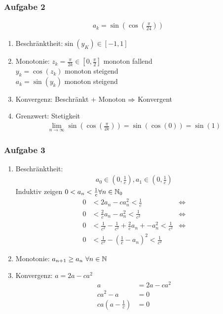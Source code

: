 \subsubsection{Aufgabe 2}
\begin{align*}
    a_k = \sin(\cos(\frac{\pi}{24}))
\end{align*}
\begin{enumerate}[label=\roman*)]
    \item Beschränktheit:$\sin(y_K) \in [-1, 1]$
    \item Monotonie: $z_k = \frac{\pi}{2k} \in [0, \frac{\pi}{2}]$ monoton fallend\\
    $y_k = \cos(z_k)$ monoton steigend\\
    $a_k = \sin(y_k)$ monoton steigend
    \item Konvergenz: Beschränkt + Monoton $\Rightarrow$ Konvergent
    \item Grenzwert: Stetigkeit
    \begin{align*}
        \lim_{n \rightarrow \infty} \sin(\cos(\frac{\pi}{2k})) = \sin(\cos(0)) = \sin(1)
    \end{align*}
\end{enumerate}
\subsubsection{Aufgabe 3}
\begin{enumerate}[label=\roman*)]
    \item Beschränktheit: 
    \begin{align*}
        a_0 \in (0, \frac{1}{c}), a_1 \in (0, \frac{1}{c})
    \end{align*}
    Induktiv zeigen $0 < a_{n} < \frac{1}{c} \forall n \in \mathbb N_0$
    \begin{align*}
        0 &< 2a_n - ca_n^2 < \frac{1}{c} &\Leftrightarrow\\
        0 &< \frac{2}{c} a_n - a_n^2 < \frac{1}{c^2} &\Leftrightarrow\\
        0 &< \frac{1}{c^2} - \frac{1}{c^2} + \frac{2}{c}a_n + - a_n ^2 < \frac{1}{c^2} &\Leftrightarrow\\
        0 &< \frac{1}{c^2} - (\frac{1}{c} - a_n)^2 < \frac{1}{c^2}
    \end{align*}
    \item Monotonie: 
    $a_{n+1} \geq a_n \ \forall n \in \mathbb N$
    \item Konvergenz: $a = 2a - ca^2$
    \begin{align*}
        a &= 2a - ca^2\\
        ca^2 - a &= 0\\
        ca(a - \frac{1}{c}) &= 0
    \end{align*}
\end{enumerate}
